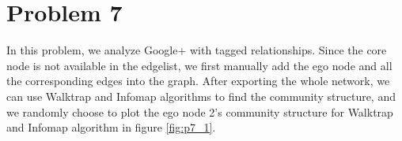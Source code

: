 \documentclass{article}
\begin{document}
\section{Problem 7}
In this problem, we analyze Google+ with tagged relationships. Since the core node is not available in the edgelist, we first manually add the ego node and all the corresponding edges into the graph. After exporting the whole network, we can use Walktrap and Infomap algorithms to find the community structure, and we randomly choose to plot the ego node 2's community structure for Walktrap and Infomap algorithm in figure \ref{fig:p7_1}.\\
\\

\begin{figure}[htbp]
\centering


\end{figure}
\end{document}
